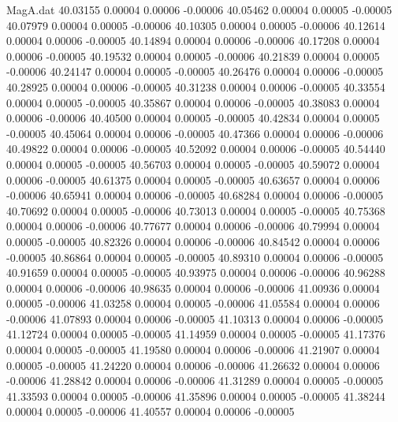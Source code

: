 \begin{filecontents}{MagA.dat}
  40.03155    0.00004    0.00006   -0.00006
  40.05462    0.00004    0.00005   -0.00005
  40.07979    0.00004    0.00005   -0.00006
  40.10305    0.00004    0.00005   -0.00006
  40.12614    0.00004    0.00006   -0.00005
  40.14894    0.00004    0.00006   -0.00006
  40.17208    0.00004    0.00006   -0.00005
  40.19532    0.00004    0.00005   -0.00006
  40.21839    0.00004    0.00005   -0.00006
  40.24147    0.00004    0.00005   -0.00005
  40.26476    0.00004    0.00006   -0.00005
  40.28925    0.00004    0.00006   -0.00005
  40.31238    0.00004    0.00006   -0.00005
  40.33554    0.00004    0.00005   -0.00005
  40.35867    0.00004    0.00006   -0.00005
  40.38083    0.00004    0.00006   -0.00006
  40.40500    0.00004    0.00005   -0.00005
  40.42834    0.00004    0.00005   -0.00005
  40.45064    0.00004    0.00006   -0.00005
  40.47366    0.00004    0.00006   -0.00006
  40.49822    0.00004    0.00006   -0.00005
  40.52092    0.00004    0.00006   -0.00005
  40.54440    0.00004    0.00005   -0.00005
  40.56703    0.00004    0.00005   -0.00005
  40.59072    0.00004    0.00006   -0.00005
  40.61375    0.00004    0.00005   -0.00005
  40.63657    0.00004    0.00006   -0.00006
  40.65941    0.00004    0.00006   -0.00005
  40.68284    0.00004    0.00006   -0.00005
  40.70692    0.00004    0.00005   -0.00006
  40.73013    0.00004    0.00005   -0.00005
  40.75368    0.00004    0.00006   -0.00006
  40.77677    0.00004    0.00006   -0.00006
  40.79994    0.00004    0.00005   -0.00005
  40.82326    0.00004    0.00006   -0.00006
  40.84542    0.00004    0.00006   -0.00005
  40.86864    0.00004    0.00005   -0.00005
  40.89310    0.00004    0.00006   -0.00005
  40.91659    0.00004    0.00005   -0.00005
  40.93975    0.00004    0.00006   -0.00006
  40.96288    0.00004    0.00006   -0.00006
  40.98635    0.00004    0.00006   -0.00006
  41.00936    0.00004    0.00005   -0.00006
  41.03258    0.00004    0.00005   -0.00006
  41.05584    0.00004    0.00006   -0.00006
  41.07893    0.00004    0.00006   -0.00005
  41.10313    0.00004    0.00006   -0.00005
  41.12724    0.00004    0.00005   -0.00005
  41.14959    0.00004    0.00005   -0.00005
  41.17376    0.00004    0.00005   -0.00005
  41.19580    0.00004    0.00006   -0.00006
  41.21907    0.00004    0.00005   -0.00005
  41.24220    0.00004    0.00006   -0.00006
  41.26632    0.00004    0.00006   -0.00006
  41.28842    0.00004    0.00006   -0.00006
  41.31289    0.00004    0.00005   -0.00005
  41.33593    0.00004    0.00005   -0.00006
  41.35896    0.00004    0.00005   -0.00005
  41.38244    0.00004    0.00005   -0.00006
  41.40557    0.00004    0.00006   -0.00005

\end{filecontents}
